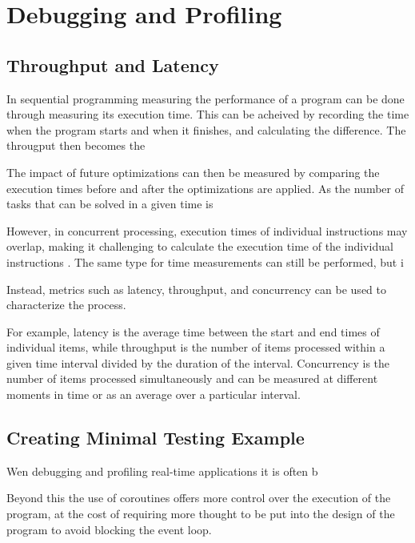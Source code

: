 
\section{Debugging and Profiling}

\subsection{Throughput and Latency}
In sequential programming measuring the performance of a program can be done through measuring its execution time.
This can be acheived by recording the time when the program starts and when it finishes, and calculating the difference.
The througput then becomes the

The impact of future optimizations can then be measured by comparing the execution times before and after the optimizations are applied.
As the number of tasks that can be solved in a given time is

However, in concurrent processing, execution times of individual instructions may overlap, making it challenging to calculate the execution time of the individual instructions \cite[21]{volkovLatencyHiding2016}.
The same type for time measurements can still be performed, but i

Instead, metrics such as latency, throughput, and concurrency can be used to characterize the process.

For example, latency is the average time between the start and end times of individual items, while throughput is the number of items processed within a given time interval divided by the duration of the interval.
Concurrency is the number of items processed simultaneously and can be measured at different moments in time or as an average over a particular interval.

\subsection{Creating Minimal Testing Example}
Wen debugging and profiling real-time applications it is often b

Beyond this the use of coroutines offers more control over the execution of the program, at the cost of requiring more thought to be put into the design of the program to avoid blocking the event loop.


